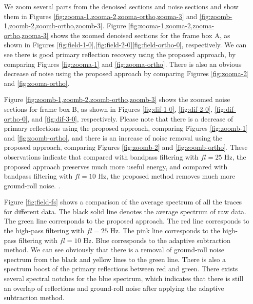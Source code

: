 We zoom several parts from the denoised sections and noise sections and show them in Figures \ref{fig:zooma-1,zooma-2,zooma-ortho,zooma-3} and \ref{fig:zoomb-1,zoomb-2,zoomb-ortho,zoomb-3}. Figure \ref{fig:zooma-1,zooma-2,zooma-ortho,zooma-3} shows the zoomed denoised sections for the frame box A, as shown in Figures \ref{fig:field-1-0},\ref{fig:field-2-0}\wen{, }\ref{fig:field-ortho-0},  respectively. We can see there is good primary reflection recovery using the proposed approach, by comparing Figures \ref{fig:zooma-1} and \ref{fig:zooma-ortho}. There is also an obvious decrease of noise using the proposed approach by comparing Figures \ref{fig:zooma-2} and \ref{fig:zooma-ortho}. 

Figure \ref{fig:zoomb-1,zoomb-2,zoomb-ortho,zoomb-3} shows the zoomed noise sections for frame box B, as shown in Figures \ref{fig:dif-1-0}, \ref{fig:dif-2-0},  \ref{fig:dif-ortho-0}, and \ref{fig:dif-3-0}, respectively. Please note that there is a decrease of primary reflections using the proposed approach, comparing Figures \ref{fig:zoomb-1} and \ref{fig:zoomb-ortho}, and there is an increase of noise removal using the proposed approach, comparing Figures \ref{fig:zoomb-2} and \ref{fig:zoomb-ortho}.  These observations indicate that compared with bandpass filtering with $fl=25$ Hz, the proposed approach preserves much more useful energy, and compared with bandpass filtering with $fl=10$ Hz, the proposed method removes much more ground-roll noise. .

Figure \ref{fig:field-fs} shows a comparison of the average spectrum of all the traces for different data. The black solid line denotes the average spectrum of raw data. The green line corresponds to the proposed approach. The red line corresponds to the high-pass filtering with $fl=25$ Hz. The pink line corresponds to the high-pass filtering with $fl=10$ Hz. Blue corresponds to the adaptive subtraction method. We can see obviously that there is a removal of ground-roll noise spectrum from the black and yellow lines to the green line.  There is also a spectrum boost of the primary reflections between red and green. There exists several spectral notches for the blue spectrum, which indicates that there is still an overlap of reflections and ground-roll noise after applying the adaptive subtraction method.

